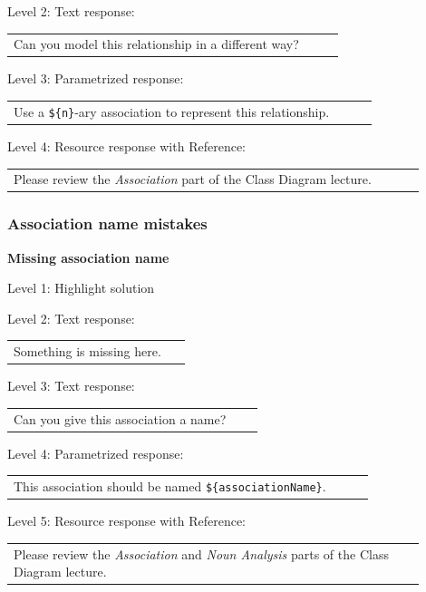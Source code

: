 \noindent Level 2: Text response: \medskip

\begin{tabular}{|p{0.9\linewidth}}
Can you model this relationship in a different way?
\end{tabular} \medskip

\noindent Level 3: Parametrized response: \medskip

\begin{tabular}{|p{0.9\linewidth}}
Use a \verb|${n}|-ary association to represent this relationship.
\end{tabular} \medskip

\noindent Level 4: Resource response with Reference: \medskip

\begin{tabular}{|p{0.9\linewidth}}
Please review the \textit{Association} part of the Class Diagram lecture.
\end{tabular} \medskip


\subsubsection{Association name mistakes}

\noindent \textbf{Missing association name} \medskip

\noindent Level 1: Highlight solution  \medskip

\noindent Level 2: Text response: \medskip

\begin{tabular}{|p{0.9\linewidth}}
Something is missing here.
\end{tabular} \medskip

\noindent Level 3: Text response: \medskip

\begin{tabular}{|p{0.9\linewidth}}
Can you give this association a name?
\end{tabular} \medskip

\noindent Level 4: Parametrized response: \medskip

\begin{tabular}{|p{0.9\linewidth}}
This association should be named \verb|${associationName}|.
\end{tabular} \medskip

\noindent Level 5: Resource response with Reference: \medskip

\begin{tabular}{|p{0.9\linewidth}}
Please review the \textit{Association} and \textit{Noun Analysis} parts of the Class Diagram lecture.
\end{tabular} \medskip


